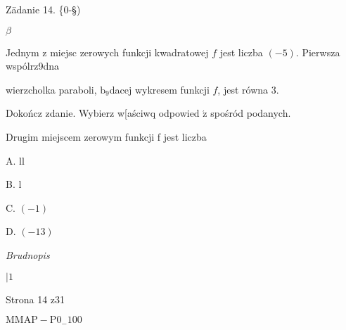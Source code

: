 \documentclass[a4paper,12pt]{article}
\begin{document}
Zädanie 14. \{0-\S)

$\beta$

Jednym z miejsc zerowych funkcji kwadratowej $f$ jest liczba $(-5)$. Pierwsza wspólrz9dna

wierzcholka paraboli, $\mathrm{b}_{9}$dacej wykresem funkcji $f$, jest równa 3.

Dokończ zdanie. Wybierz w[aściwq odpowied $\acute{\mathrm{z}}$ spośród podanych.

Drugim miejscem zerowym funkcji f jest liczba

A. ll

B. l

C. $(-1)$

D. $(-13)$

{\it Brudnopis}

$| 1$

Strona 14 z31

$\mathrm{M}\mathrm{M}\mathrm{A}\mathrm{P}-\mathrm{P}0_{-}100$
\end{document}
